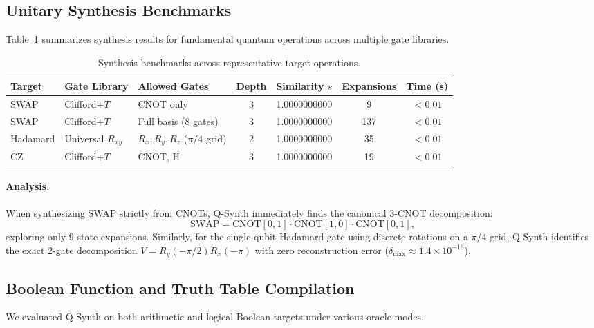 \documentclass[11pt]{article}
\newcommand{\CNOT}{\mathrm{CNOT}}
\begin{document}
\subsection{Unitary Synthesis Benchmarks}
Table~\ref{tab:synth_results} summarizes synthesis results for fundamental quantum operations across multiple gate libraries.

\begin{table}[htbp]
\centering
\small
\begin{tabular}{@{}lllcccc@{}}
\toprule
\textbf{Target} & \textbf{Gate Library} & \textbf{Allowed Gates} & \textbf{Depth} & \textbf{Similarity $s$} & \textbf{Expansions} & \textbf{Time (s)} \\ \midrule
SWAP & Clifford$+T$ & CNOT only & 3 & 1.0000000000 & 9 & $<0.01$ \\
SWAP & Clifford$+T$ & Full basis (8 gates) & 3 & 1.0000000000 & 137 & $<0.01$ \\
Hadamard & Universal $R_{xy}$ & $R_x, R_y, R_z$ ($\pi/4$ grid) & 2 & 1.0000000000 & 35 & $<0.01$ \\
CZ & Clifford$+T$ & CNOT, H & 3 & 1.0000000000 & 19 & $<0.01$ \\
\bottomrule
\end{tabular}
\caption{Synthesis benchmarks across representative target operations.}
\label{tab:synth_results}
\end{table}

\paragraph{Analysis.}
When synthesizing SWAP strictly from CNOTs, Q-Synth immediately finds the canonical 3-CNOT decomposition:
\begin{equation}
    \mathrm{SWAP} = \CNOT[0, 1] \cdot \CNOT[1, 0] \cdot \CNOT[0, 1],
\end{equation}
exploring only 9 state expansions. Similarly, for the single-qubit Hadamard gate using discrete rotations on a $\pi/4$ grid, Q-Synth identifies the exact 2-gate decomposition $V = R_y(-\pi/2) R_x(-\pi)$ with zero reconstruction error ($\delta_{\max} \approx 1.4 \times 10^{-16}$).

\subsection{Boolean Function and Truth Table Compilation}
We evaluated Q-Synth on both arithmetic and logical Boolean targets under various oracle modes.
\end{document}

